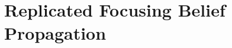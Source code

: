\documentclass{standalone}
\begin{document}
\section[rFBP]{Replicated Focusing Belief Propagation}\label{rfbp}

\end{document}
